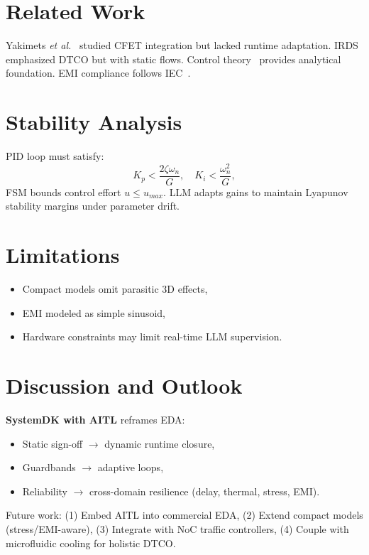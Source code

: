 \documentclass[conference]{IEEEtran}
\begin{document}
\section{Related Work}
Yakimets \textit{et al.}~\cite{yakimets2020cfet} studied CFET integration but lacked runtime adaptation.  
IRDS~\cite{irds2023} emphasized DTCO but with static flows.  
Control theory~\cite{franklin2015feedback,khalil2002nonlinear,anderson2007optimal} provides analytical foundation.  
EMI compliance follows IEC~\cite{iec61000}.

\section{Stability Analysis}
PID loop must satisfy:
\begin{equation}
K_p < \frac{2\zeta\omega_n}{G}, \quad K_i < \frac{\omega_n^2}{G},
\end{equation}
FSM bounds control effort $u \leq u_{max}$.  
LLM adapts gains to maintain Lyapunov stability margins under parameter drift.

\section{Limitations}
\begin{itemize}
  \item Compact models omit parasitic 3D effects,
  \item EMI modeled as simple sinusoid,
  \item Hardware constraints may limit real-time LLM supervision.
\end{itemize}

\section{Discussion and Outlook}
\textbf{SystemDK with AITL} reframes EDA:
\begin{itemize}
  \item Static sign-off $\to$ dynamic runtime closure,
  \item Guardbands $\to$ adaptive loops,
  \item Reliability $\to$ cross-domain resilience (delay, thermal, stress, EMI).
\end{itemize}

Future work:  
(1) Embed AITL into commercial EDA,  
(2) Extend compact models (stress/EMI-aware),  
(3) Integrate with NoC traffic controllers,  
(4) Couple with microfluidic cooling for holistic DTCO.
\end{document}
